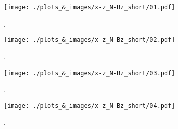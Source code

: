 \documentclass[12pt, letterpaper]{article}
\begin{document}
\begin{figure}[!ht]
\begin{center}
	\texttt{[image: ./plots\_\&\_images/x-z\_N-Bz\_short/01.pdf]}
	\caption{.}
	\label{fig:x-z_N-Bz_short_01}
\end{center}
\end{figure}
\begin{figure}[!ht]
\begin{center}
	\texttt{[image: ./plots\_\&\_images/x-z\_N-Bz\_short/02.pdf]}
	\caption{.}
	\label{fig:x-z_N-Bz_short_02}
\end{center}
\end{figure}
\begin{figure}[!ht]
\begin{center}
	\texttt{[image: ./plots\_\&\_images/x-z\_N-Bz\_short/03.pdf]}
	\caption{.}
	\label{fig:x-z_N-Bz_short_03}
\end{center}
\end{figure}
\begin{figure}[!ht]
\begin{center}
	\texttt{[image: ./plots\_\&\_images/x-z\_N-Bz\_short/04.pdf]}
	\caption{.}
	\label{fig:x-z_N-Bz_short_04}
\end{center}
\end{figure}









\end{document}
